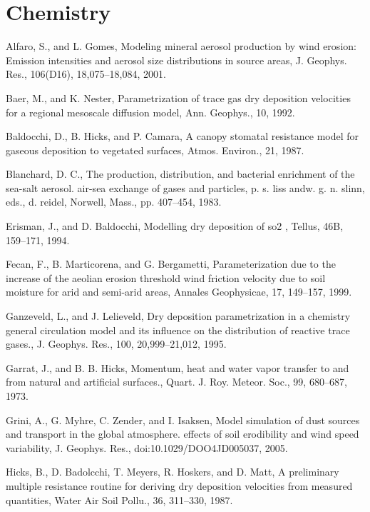 \section{Chemistry}
\begin{description}

\item
Alfaro, S., and L. Gomes, Modeling mineral aerosol production by wind erosion: Emission intensities and
  aerosol size distributions in source areas, J. Geophys. Res., 106(D16), 18,075–18,084, 2001.
\item
Baer, M., and K. Nester, Parametrization of trace gas dry deposition velocities for a regional mesoscale
  diffusion model, Ann. Geophys., 10, 1992.
\item
Baldocchi, D., B. Hicks, and P. Camara, A canopy stomatal resistance model for gaseous deposition to
  vegetated surfaces, Atmos. Environ., 21, 1987.
\item
Blanchard, D. C., The production, distribution, and bacterial enrichment of the sea-salt aerosol. air-sea
  exchange of gases and particles, p. s. liss andw. g. n. slinn, eds., d. reidel, Norwell, Mass., pp. 407–454,
  1983.
\item
Erisman, J., and D. Baldocchi, Modelling dry deposition of so2 , Tellus, 46B, 159–171, 1994.
\item
Fecan, F., B. Marticorena, and G. Bergametti, Parameterization due to the increase of the aeolian erosion
  threshold wind friction velocity due to soil moisture for arid and semi-arid areas, Annales Geophysicae,
  17, 149–157, 1999.
\item
Ganzeveld, L., and J. Lelieveld, Dry deposition parametrization in a chemistry general circulation model
  and its influence on the distribution of reactive trace gases., J. Geophys. Res., 100, 20,999–21,012, 1995.
\item
Garrat, J., and B. B. Hicks, Momentum, heat and water vapor transfer to and from natural and artificial
  surfaces., Quart. J. Roy. Meteor. Soc., 99, 680–687, 1973.
\item
Grini, A., G. Myhre, C. Zender, and I. Isaksen, Model simulation of dust sources and transport
  in the global atmosphere. effects of soil erodibility and wind speed variability, J. Geophys. Res.,
  doi:10.1029/DOO4JD005037, 2005.
\item
Hicks, B., D. Badolcchi, T. Meyers, R. Hoskers, and D. Matt, A preliminary multiple resistance routine for
  deriving dry deposition velocities from measured quantities, Water Air Soil Pollu., 36, 311–330, 1987.

\end{description}
